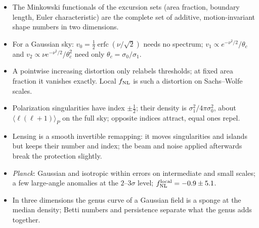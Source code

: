 \begin{recap}
\begin{itemize}[itemsep=1pt,leftmargin=1.2em]
  \item The Minkowski functionals of the excursion sets (area fraction, boundary length, Euler characteristic) are the complete set of additive, motion-invariant shape numbers in two dimensions.
  \item For a Gaussian sky: $v_0=\frac12\operatorname{erfc}(\nu/\sqrt2)$ needs no spectrum; $v_1\propto e^{-\nu^2/2}/\theta_c$ and $v_2\propto\nu e^{-\nu^2/2}/\theta_c^2$ need only $\theta_c=\sigma_0/\sigma_1$.
  \item A pointwise increasing distortion only relabels thresholds; at fixed area fraction it vanishes exactly. Local $f_{\rm NL}$ is such a distortion on Sachs--Wolfe scales.
  \item Polarization singularities have index $\pm\frac12$; their density is $\sigma_1^2/4\pi\sigma_0^2$, about $\langle\ell(\ell+1)\rangle_P$ on the full sky; opposite indices attract, equal ones repel.
  \item Lensing is a smooth invertible remapping: it moves singularities and islands but keeps their number and index; the beam and noise applied afterwards break the protection slightly.
  \item \textit{Planck}: Gaussian and isotropic within errors on intermediate and small scales; a few large-angle anomalies at the $2$--$3\sigma$ level; $f_{\rm NL}^{\rm local}=-0.9\pm5.1$.
  \item In three dimensions the genus curve of a Gaussian field is a sponge at the median density; Betti numbers and persistence separate what the genus adds together.
\end{itemize}
\end{recap}
  
